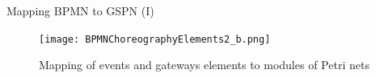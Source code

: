 \documentclass[xcolor=svgnames]{beamer}
\begin{document}

\begin{frame}{Mapping BPMN to GSPN (I)}
        \begin{figure}[!h]
    	\centering
    	\texttt{[image: BPMNChoreographyElements2\_b.png]}
    	\caption{Mapping of events and gateways elements to modules of Petri nets}
         \end{figure}
    
\end{frame}
\end{document}
